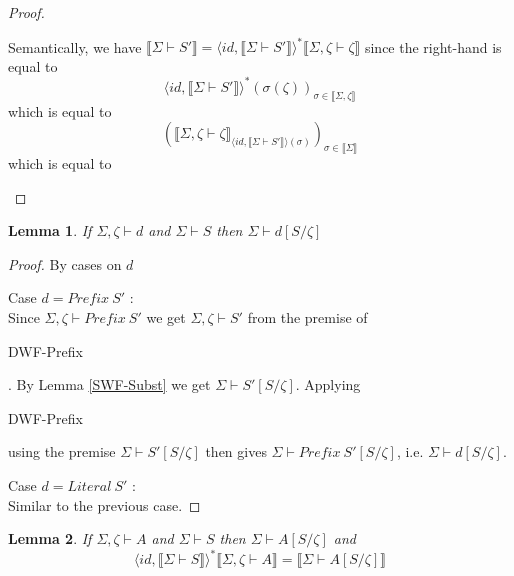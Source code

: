 \documentclass{article}
\newtheorem{lemma}{Lemma}
\newcommand{\sem}[1]{\llbracket #1 \rrbracket}
\begin{document}
\begin{proof}
\begin{description}
\begin{description}
Semantically, we have $\sem{\Sigma \vdash S'} = \langle \mathit{id}, \sem{\Sigma \vdash S'} \rangle^* \sem{\Sigma,\zeta \vdash \zeta}$ since the right-hand is equal to $$\langle \mathit{id}, \sem{\Sigma \vdash S'} \rangle^* (\sigma(\zeta))_{\sigma \in \sem{\Sigma,\zeta}}$$
which is equal to
$$( \sem{\Sigma,\zeta \vdash \zeta}_{\langle \mathit{id}, \sem{\Sigma \vdash S'} \rangle(\sigma)} )_{\sigma \in \sem{\Sigma}}$$
which is equal to
$$ $$
\end{description}

\end{description}

\end{proof}

\begin{lemma}
If $\Sigma,\zeta \vdash d$ and $\Sigma \vdash S$ then $\Sigma \vdash d[S/\zeta]$
\label{DWF-Subst}
\end{lemma}

\begin{proof}
By cases on $d$

\item[Case $d = \mathit{Prefix}~S'$]:\\
Since $\Sigma,\zeta \vdash \mathit{Prefix}~S'$ we get $\Sigma,\zeta \vdash S'$ from the premise of 
\begin{sc}DWF-Prefix\end{sc}. By Lemma \ref{SWF-Subst} we get $\Sigma \vdash S'[S/\zeta]$. Applying
\begin{sc}DWF-Prefix\end{sc} using the premise $\Sigma \vdash S'[S/\zeta]$ then gives $\Sigma \vdash \mathit{Prefix}~S'[S/\zeta]$, i.e. $\Sigma \vdash d[S/\zeta]$.

\item[Case $d = \mathit{Literal}~S'$]:\\
Similar to the previous case.

\end{proof}

\begin{lemma}
If $\Sigma,\zeta \vdash A$ and $\Sigma \vdash S$ then $\Sigma \vdash A[S/\zeta]$ and
$$\langle \mathit{id}, \sem{\Sigma \vdash S} \rangle^* \sem{\Sigma, \zeta \vdash A} = \sem{\Sigma \vdash A[S/\zeta]}$$
\end{lemma}
\end{document}

